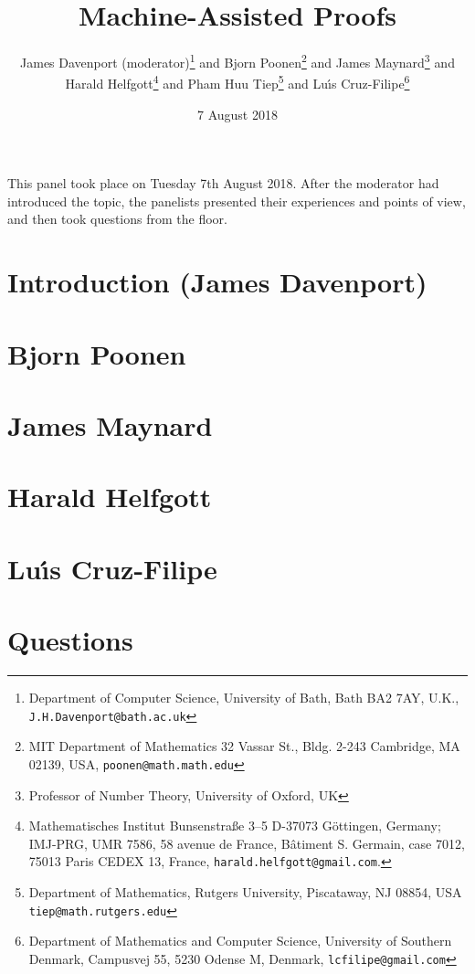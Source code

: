 \documentclass{article}
\begin{document}
\title{Machine-Assisted Proofs}
\author{James Davenport (moderator)\footnote{Department of Computer Science, University of Bath, Bath BA2 7AY, U.K., {\tt J.H.Davenport@bath.ac.uk}}{ } and Bjorn Poonen\footnote{MIT Department of Mathematics
32 Vassar St., Bldg. 2-243
Cambridge, MA 02139, USA, {\tt poonen@math.math.edu}}{ } and James Maynard\footnote{Professor of Number Theory, University of Oxford, UK}{ } and \\Harald Helfgott\footnote{Mathematisches Institut
Bunsenstra{\ss}e 3--5
D-37073 G\"ottingen, Germany;   IMJ-PRG, UMR 7586,
  58 avenue de France, B\^{a}timent S. Germain, case 7012,
  75013 Paris CEDEX 13, France, {\tt harald.helfgott@gmail.com}.}{ } and Pham Huu Tiep\footnote{Department of Mathematics,  Rutgers University, Piscataway, NJ 08854, USA %
{\tt tiep@math.rutgers.edu}}{ } and Lu\'\i{}s Cruz-Filipe\footnote{Department of Mathematics and Computer Science, University of Southern Denmark, Campusvej 55,
5230 Odense M,
Denmark, {\tt lcfilipe@gmail.com}}}
\date{7 August 2018}
\maketitle\noindent
This panel took place on Tuesday 7th August 2018. After the moderator had introduced the topic, the panelists presented their experiences and points of view, and then took questions from the floor.
\section{Introduction (James Davenport)}

\section{Bjorn Poonen}

\section{James Maynard}

\section{Harald Helfgott}


\section{Lu\'\i{}s Cruz-Filipe}

\section{Questions}


\end{document}
